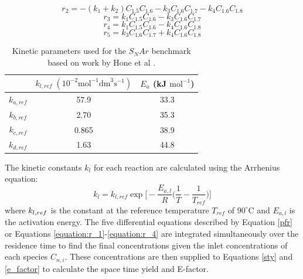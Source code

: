 \begin{equation}
	r_2 = -(k_1+k_2)C_{1.5}C_{1.6}-k_3C_{1.6}C_{1.7}-k_4C_{1.6}C_{1.8}
\end{equation}
\begin{equation}
	r_3 = k_1C_{1.5}C_{1.6}-k_3C_{1.6}C_{1.7}
\end{equation}
\begin{equation}
	r_4 = k_1C_{1.5}C_{1.6}-k_4C_{1.6}C_{1.8}
	\label{equation:r_4}
\end{equation}
\begin{equation}
	\label{last_snar_rxn_rate}
	r_5 = k_3C_{1.6}C_{1.7} + k_4C_{1.6}C_{1.8}
\end{equation}

\begin{table}[tb]
  \centering
  \caption{Kinetic parameters used for the $S_NAr$ benchmark based on work by Hone et al \cite{Hone2017}.}
  \begin{tabular}{ccc}
    &$k_{l,ref} \; (10^{-2} \text{mol}^{-1} \text{dm}^3 \text{s}^{-1})$ & $E_a$ (kJ $\text{mol}^{-1}$) \\
    \hline
    $k_{a,ref}$ & 57.9 & 33.3  \\
    $k_{b,ref}$ & 2.70 & 35.3  \\
    $k_{c,ref}$ & 0.865 & 38.9 \\
    $k_{d,ref}$ & 1.63 & 44.8 \\
  \end{tabular}
  
  \label{table:snar_parameters}
\end{table}

The kinetic constants $k_l$ for each reaction are calculated using the Arrhenius equation:
\begin{equation}
	k_l = k_{l, ref} \exp\Biggl[-\frac{E_{a,l}}{R}\biggl(\frac{1}{T}-\frac{1}{T_{ref}}\biggr)\Biggr]
\end{equation}
where $k_{l, \\ref}$ is the constant at the reference temperature $T_{ref}$ of $90^{\circ}$C and $E_{a,l}$ is the activation energy. The five differential equations described by Equation \ref{pfr} or Equations \ref{equation:r_1}-\ref{equation:r_4}  are integrated simultaneously over the residence time to find the final concentrations given the inlet concentrations of each species $C_{n,i}$. These concentrations are then supplied to Equations \ref{sty} and \ref{e_factor} to calculate the space time yield and E-factor.



